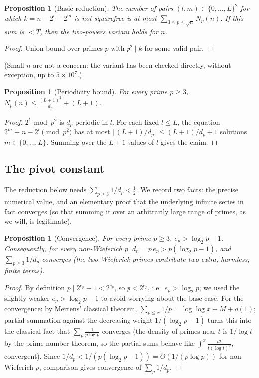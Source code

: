 \documentclass[11pt]{article}
\theoremstyle{plain}
\newtheorem{proposition}[theorem]{Proposition}
\theoremstyle{definition}
\theoremstyle{remark}
\newcommand{\dpp}{d_p}
\newcommand{\ep}{e_p}
\begin{document}
\begin{proposition}[Basic reduction]\label{prop:star}
The number of pairs $(l,m)\in\{0,\dots,L\}^2$ for which $k=n-2^l-2^m$ is
\emph{not} squarefree is at most $\sum_{3\le p\le\sqrt n}N_p(n)$. If this sum
is $<T$, then the two-powers variant holds for $n$.
\end{proposition}
\begin{proof}
Union bound over primes $p$ with $p^2\mid k$ for some valid pair.
\end{proof}

(Small $n$ are not a concern: the variant has been checked directly, without
exception, up to $5\times10^7$.)

\begin{proposition}[Periodicity bound]\label{prop:periodic}
For every prime $p\ge3$, $\displaystyle N_p(n)\le\frac{(L+1)^2}{\dpp}+(L+1)$.
\end{proposition}
\begin{proof}
$2^l\bmod p^2$ is $\dpp$-periodic in $l$. For each fixed $l\le L$, the
equation $2^m\equiv n-2^l\pmod{p^2}$ has at most
$\lceil(L+1)/\dpp\rceil\le(L+1)/\dpp+1$ solutions $m\in\{0,\dots,L\}$. Summing
over the $L+1$ values of $l$ gives the claim.
\end{proof}

\subsection{The pivot constant}\label{sec:pivot}

The reduction below needs $\sum_{p\ge3}1/\dpp<\tfrac12$. We record two facts:
the precise numerical value, and an elementary proof that the underlying
infinite series in fact converges (so that summing it over an arbitrarily
large range of primes, as we will, is legitimate).

\begin{proposition}[Convergence]\label{prop:convergence}
For every prime $p\ge3$, $\ep>\log_2p-1$. Consequently, for every
non-Wieferich $p$, $\dpp=p\,\ep>p(\log_2p-1)$, and
$\sum_{p\ge3}1/\dpp$ converges (the two Wieferich primes contribute two
extra, harmless, finite terms).
\end{proposition}
\begin{proof}
By definition $p\mid2^{\ep}-1<2^{\ep}$, so $p<2^{\ep}$, i.e.\
$\ep>\log_2p$; we used the slightly weaker $\ep>\log_2p-1$ to avoid
worrying about the base case. For the convergence: by Mertens' classical
theorem, $\sum_{p\le x}1/p=\log\log x+M+o(1)$; partial summation against the
decreasing weight $1/(\log_2p-1)$ turns this into the classical fact that
$\sum_p\frac1{p\log p}$ converges (the density of primes near $t$ is
$1/\log t$ by the prime number theorem, so the partial sums behave like
$\int^x\frac{dt}{t(\log t)^2}$, convergent). Since $1/\dpp<1/(p(\log_2p-1))=
O(1/(p\log p))$ for non-Wieferich $p$, comparison gives convergence of
$\sum_p1/\dpp$.
\end{proof}
\end{document}
